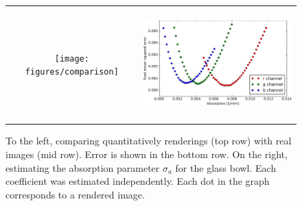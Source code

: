 \begin{figure}
\begin{tabular}{@{}c@{}c@{}}
	 \texttt{[image: figures/comparison]} & \hspace{2em}
	 \includegraphics[height=4.3cm]{figures/glass_bowl_analysis_by_synthesis}  \\
\end{tabular}
\caption{To the left, comparing quantitatively renderings (top row) with real images (mid row). Error is shown in the bottom row. On the right, estimating the absorption parameter $\sigma_a$ for the glass bowl. Each coefficient was estimated independently. Each dot in the graph corresponds to a rendered image. }
\label{fig:glasscomparison}
\end{figure}
